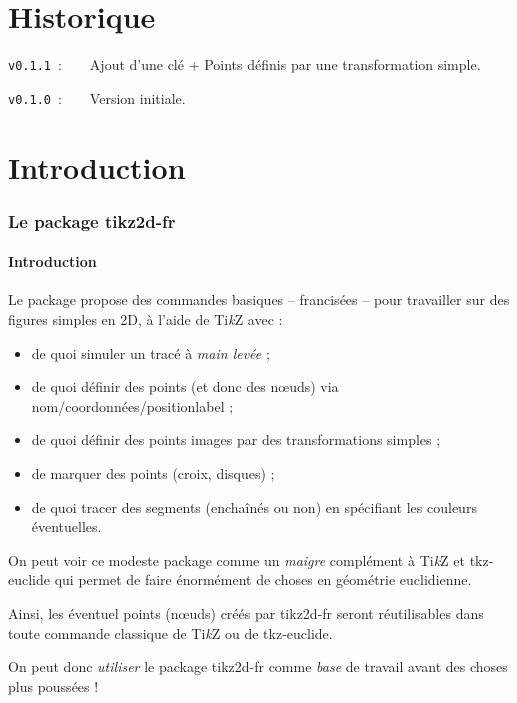 \documentclass[french,a4paper,11pt]{article}
\providecommand\tikzlogo{Ti\textit{k}Z}
\let\TikZ\tikzlogo
\newcommand\Cle[1]{{\bfseries\sffamily\textlangle #1\textrangle}}
\newcommand\cmaj[1]{\tcbox[vignetteMaJ]{#1}\xspace}
\begin{document}
\part{Historique}

\verb|v0.1.1|~:~~~~Ajout d'une clé \Cle{[TaillePolice]} + Points définis par une transformation simple.

\verb|v0.1.0|~:~~~~Version initiale.

\newpage

\part{Introduction}

\section{Le package tikz2d-fr}

\subsection{Introduction}

\begin{noteblock}
Le package propose des commandes basiques -- francisées -- pour travailler sur des figures simples en 2D, à l'aide de \TikZ{} avec :

\begin{itemize}
	\item de quoi simuler un tracé à \textit{main levée} ;
	\item de quoi définir des points (et donc des nœuds) via \textsf{nom/coordonnées/positionlabel} ;
	\item \cmaj{0.1.1} de quoi définir des points images par des transformations simples ;
	\item de marquer des points (croix, disques) ;
	\item de quoi tracer des segments (enchaînés ou non) en spécifiant les couleurs éventuelles.
\end{itemize}
\vspace*{-\baselineskip}\leavevmode
\end{noteblock}

\begin{importantblock}
On peut voir ce modeste package comme un \textit{maigre} complément à \TikZ{} et \textsf{tkz-euclide}\footnotemark{} qui permet de faire énormément de choses en géométrie euclidienne.

\smallskip

Ainsi, les éventuel points (nœuds) créés par \textsf{tikz2d-fr} seront réutilisables dans toute commande classique de \TikZ{} ou de \textsf{tkz-euclide}.

\smallskip

On peut donc \textit{utiliser} le package \textsf{tikz2d-fr} comme \textit{base} de travail avant des choses plus poussées !
\end{importantblock}
\end{document}
